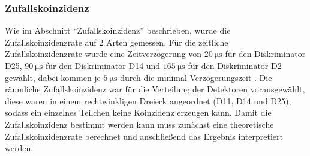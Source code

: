 \documentclass{article}
\begin{document}
\subsubsection*{Zufallskoinzidenz}
Wie im Abschnitt \enquote{Zufallskoinzidenz} beschrieben, wurde die Zufallskoinzidenzrate auf 2 Arten gemessen.
Für die zeitliche Zufallskoinzidenzrate wurde eine Zeitverzögerung von $\SI{20}{\micro\second}$ für den Diskriminator D25, $\SI{90}{\micro\second}$ für den Diskriminator D14 und 
$\SI{165}{\micro\second}$ für den Diskriminator D2 gewählt, dabei kommen je $\SI{5}{\micro\second}$ durch die minimal Verzögerungszeit \cite{Anleitung}.
Die räumliche Zufallskoinzidenz war für die Verteilung der Detektoren vorausgewählt, diese waren in einem rechtwinkligen Dreieck angeordnet (D11, D14 und D25), sodass ein einzelnes Teilchen keine Koinzidenz erzeugen kann.
Damit die Zufallskoinzidenz bestimmt werden kann muss zunächst eine theoretische Zufallskoinzidenzrate berechnet und anschließend das Ergebnis interpretiert werden.
\end{document}

